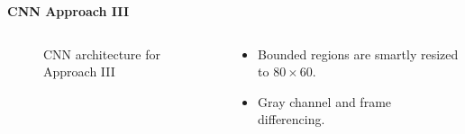 \begin{frame}{\textbf{CNN Approach III}}
\begin{columns}
	\begin{column}{0.6\textwidth}
	\begin{figure}
		\centering
		\caption{CNN architecture for Approach III}
	\end{figure}
	\end{column}
	\begin{column}{0.4\textwidth}
		\begin{varblock}[0.85\textwidth]{}
		\begin{itemize}
			\item Bounded regions are smartly resized to $80 \times 60$.
			\item Gray channel and frame differencing.
		\end{itemize}
		\end{varblock}
	\end{column}
\end{columns}
\end{frame}


